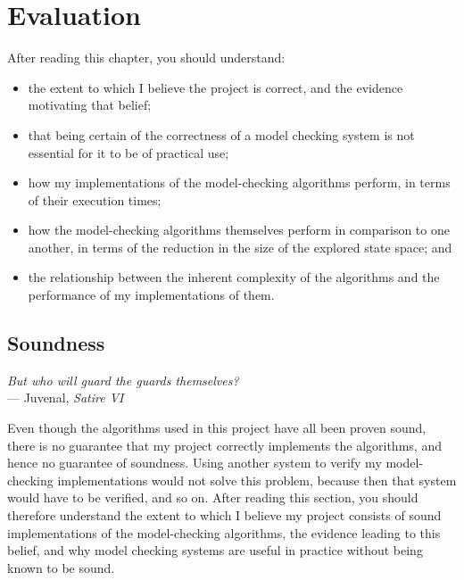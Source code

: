 \documentclass[12pt,a4paper,twoside,openright]{report}
\newenvironment{understandinglist}
	{\begin{itemize} \itemsep 0em}{\end{itemize}}
\begin{document}
\chapter{Evaluation}
\label{cha:evaluation}

After reading this chapter,
you should understand:
\begin{understandinglist}
	\item the extent to which I believe
	the project is correct, and the evidence
	motivating that belief;
	\item that being certain of the
	correctness of a model checking
	system is not essential for it
	to be of practical use;
	\item how my implementations
	of the model-checking algorithms
	perform, in terms of their
	execution times;
	\item how the model-checking
	algorithms themselves perform
	in comparison to one another,
	in terms of the reduction in the
	size of the explored state space; and
	\item the relationship between the
	inherent complexity of the
	algorithms and the performance of
	my implementations of them.
\end{understandinglist}

\section{Soundness}

\begin{center}
	\textit{But who will guard the guards themselves?} \\
	\qquad\qquad\qquad --- Juvenal, \textit{Satire VI}
\end{center}

Even though the algorithms
used in this project have all been proven sound,
there is no guarantee that my project correctly
implements the algorithms, and hence no
guarantee of soundness. Using another
system to verify
my model-checking implementations would not
solve this problem, because then that system
would have to be verified, and so on.
After reading this section, you should
therefore understand the extent to which I believe
my project consists of sound implementations
of the model-checking algorithms, the
evidence leading to this belief, and why
model checking systems are useful in
practice without being known to be
sound.
\end{document}
